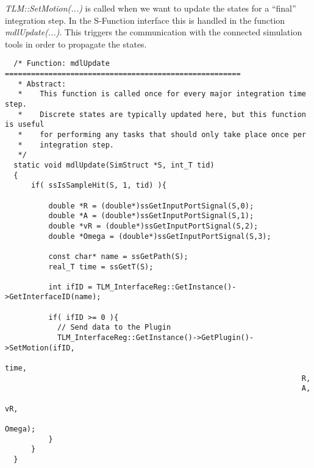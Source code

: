 {\em TLM::SetMotion(...)} is called when we want to update the states
for a ``final'' integration step. In the S-Function interface this is
handled in the function {\em mdlUpdate(...)}. This triggers the
communication with the connected simulation tools in order to
propagate the states.

{\scriptsize
\begin{verbatim}
  /* Function: mdlUpdate ======================================================
   * Abstract:
   *    This function is called once for every major integration time step.
   *    Discrete states are typically updated here, but this function is useful
   *    for performing any tasks that should only take place once per
   *    integration step.
   */
  static void mdlUpdate(SimStruct *S, int_T tid)
  {
      if( ssIsSampleHit(S, 1, tid) ){

          double *R = (double*)ssGetInputPortSignal(S,0);
          double *A = (double*)ssGetInputPortSignal(S,1);
          double *vR = (double*)ssGetInputPortSignal(S,2);
          double *Omega = (double*)ssGetInputPortSignal(S,3);

          const char* name = ssGetPath(S);
          real_T time = ssGetT(S);

          int ifID = TLM_InterfaceReg::GetInstance()->GetInterfaceID(name);

          if( ifID >= 0 ){
            // Send data to the Plugin
            TLM_InterfaceReg::GetInstance()->GetPlugin()->SetMotion(ifID,
                                                                    time,
                                                                    R,
                                                                    A,
                                                                    vR,
                                                                    Omega);
          }
      }
  }
\end{verbatim}
} 